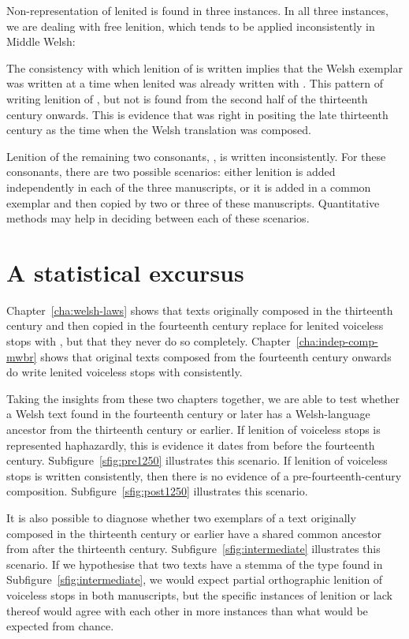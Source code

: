 Non-representation of lenited  is found in three instances. In all three instances, we are dealing with free lenition, which tends to be applied inconsistently in Middle Welsh:


The consistency with which lenition of  is written implies that the Welsh exemplar was written at a time when lenited  was already written with . This pattern of writing lenition of , but not  is found from the second half of the thirteenth century onwards. This is evidence that \textcite{Rob_Ystoriaeu11} was right in positing the late thirteenth century as the time when the Welsh translation was composed.

Lenition of the remaining two consonants, , is written inconsistently. For these consonants, there are two possible scenarios: either lenition is added independently in each of the three manuscripts, or it is added in a common exemplar and then copied by two or three of these manuscripts. Quantitative methods may help in deciding between each of these scenarios.


\section{A statistical excursus}
\label{sec:statistical-excursus}


Chapter~\ref{cha:welsh-laws} shows that texts originally composed in the thirteenth century and then copied in the fourteenth century replace  for lenited voiceless stops with , but that they never do so completely. Chapter~\ref{cha:indep-comp-mwbr} shows that original texts composed from the fourteenth century onwards do write lenited voiceless stops with  consistently.

Taking the insights from these two chapters together, we are able to test whether a Welsh text found in the fourteenth century or later has a Welsh-language ancestor from the thirteenth century or earlier. If lenition of voiceless stops is represented haphazardly, this is evidence it dates from before the fourteenth century. Subfigure~\ref{sfig:pre1250} illustrates this scenario. If lenition of voiceless stops is written consistently, then there is no evidence of a pre-fourteenth-century composition. Subfigure~\ref{sfig:post1250} illustrates this scenario.

It is also possible to diagnose whether two exemplars of a text originally composed in the thirteenth century or earlier have a shared common ancestor from after the thirteenth century. Subfigure~\ref{sfig:intermediate} illustrates this scenario. If we hypothesise that two texts have a stemma of the type found in Subfigure~\ref{sfig:intermediate}, we would expect partial orthographic lenition of voiceless stops in both manuscripts, but the specific instances of lenition or lack thereof would agree with each other in more instances than what would be expected from chance.

